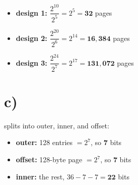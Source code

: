 \documentclass[11pt]{article}
\begin{document}
\begin{itemize}
  \item \textbf{design 1:} $\dfrac{2^{10}}{2^{5}} = 2^{5} = \mathbf{32}$ pages
  \item \textbf{design 2:} $\dfrac{2^{20}}{2^{6}} = 2^{14} = \mathbf{16{,}384}$ pages
  \item \textbf{design 3:} $\dfrac{2^{24}}{2^{7}} = 2^{17} = \mathbf{131{,}072}$ pages
\end{itemize}

\section*{c)}

splits into outer, inner, and offset:

\begin{itemize}
  \item \textbf{outer:} 128 entries $= 2^{7}$, so $\mathbf{7}$ bits
  \item \textbf{offset:} 128-byte page $= 2^{7}$, so $\mathbf{7}$ bits
  \item \textbf{inner:} the rest, $36 - 7 - 7 = \mathbf{22}$ bits
\end{itemize}
\end{document}
